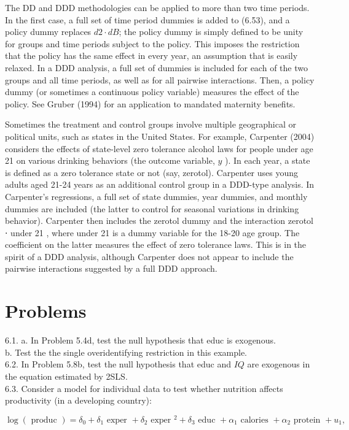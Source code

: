 \documentclass[10pt]{article}
\begin{document}
The DD and DDD methodologies can be applied to more than two time periods. In the first case, a full set of time period dummies is added to (6.53), and a policy dummy replaces $d 2 \cdot d B$; the policy dummy is simply defined to be unity for groups and time periods subject to the policy. This imposes the restriction that the policy has the same effect in every year, an assumption that is easily relaxed. In a DDD analysis, a full set of dummies is included for each of the two groups and all time periods, as well as for all pairwise interactions. Then, a policy dummy (or sometimes a continuous policy variable) measures the effect of the policy. See Gruber (1994) for an application to mandated maternity benefits.

Sometimes the treatment and control groups involve multiple geographical or political units, such as states in the United States. For example, Carpenter (2004) considers the effects of state-level zero tolerance alcohol laws for people under age 21 on various drinking behaviors (the outcome variable, $y$ ). In each year, a state is defined as a zero tolerance state or not (say, zerotol). Carpenter uses young adults aged 21-24 years as an additional control group in a DDD-type analysis. In Carpenter's regressions, a full set of state dummies, year dummies, and monthly dummies are included (the latter to control for seasonal variations in drinking behavior). Carpenter then includes the zerotol dummy and the interaction zerotol ⋅ under 21 , where under 21 is a dummy variable for the 18-20 age group. The coefficient on the latter measures the effect of zero tolerance laws. This is in the spirit of a DDD analysis, although Carpenter does not appear to include the pairwise interactions suggested by a full DDD approach.

\section*{Problems}
6.1. a. In Problem 5.4d, test the null hypothesis that educ is exogenous.\\
b. Test the the single overidentifying restriction in this example.\\
6.2. In Problem 5.8b, test the null hypothesis that educ and $I Q$ are exogenous in the equation estimated by 2SLS.\\
6.3. Consider a model for individual data to test whether nutrition affects productivity (in a developing country):


\begin{equation*}
\log (\text { produc })=\delta_{0}+\delta_{1} \text { exper }+\delta_{2} \text { exper }^{2}+\delta_{3} \text { educ }+\alpha_{1} \text { calories }+\alpha_{2} \text { protein }+u_{1}, \tag{6.57}
\end{equation*}
\end{document}
